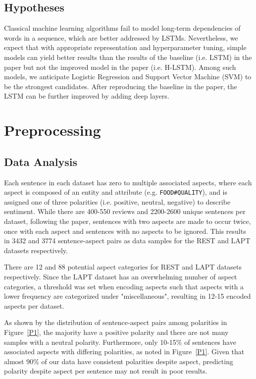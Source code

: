\documentclass[comsoc,conference]{IEEEtran}
\begin{document}
\subsection{Hypotheses}

Classical machine learning algorithms fail to model long-term dependencies of words in a sequence, which are better addressed by LSTMs. Nevertheless, we expect that with appropriate representation and hyperparameter tuning, simple models can yield better results than the results of the baseline (i.e. LSTM) in the paper but not the improved model in the paper (i.e. H-LSTM). Among such models, we anticipate Logistic Regression and Support Vector Machine (SVM) to be the strongest candidates. After reproducing the baseline in the paper, the LSTM can be further improved by adding deep layers. 

\section{Preprocessing}

\subsection{Data Analysis}

Each sentence in each dataset has zero to multiple associated aspects, where each aspect is composed of an entity and attribute (e.g. \texttt{FOOD\#QUALITY}), and is assigned one of three polarities (i.e. positive, neutral, negative) to describe sentiment. While there are 400-550 reviews and 2200-2600 unique sentences per dataset, following the paper, sentences with two aspects are made to occur twice, once with each aspect and sentences with no aspects to be ignored. This results in 3432 and 3774 sentence-aspect pairs as data samples for the REST and LAPT datasets respectively.

There are 12 and 88 potential aspect categories for REST and LAPT datasets respectively. Since the LAPT dataset has an overwhelming number of aspect categories, a threshold was set when encoding aspects such that aspects with a lower frequency are categorized under "miscellaneous", resulting in 12-15 encoded aspects per dataset.

As shown by the distribution of sentence-aspect pairs among polarities in Figure~\ref{P1}, the majority have a positive polarity and there are not many samples with a neutral polarity. Furthermore, only 10-15\% of sentences have associated aspects with differing polarities, as noted in Figure~\ref{P1}. Given that almost 90\% of our data have consistent polarities despite aspect, predicting polarity despite aspect per sentence may not result in poor results. 
\end{document}

